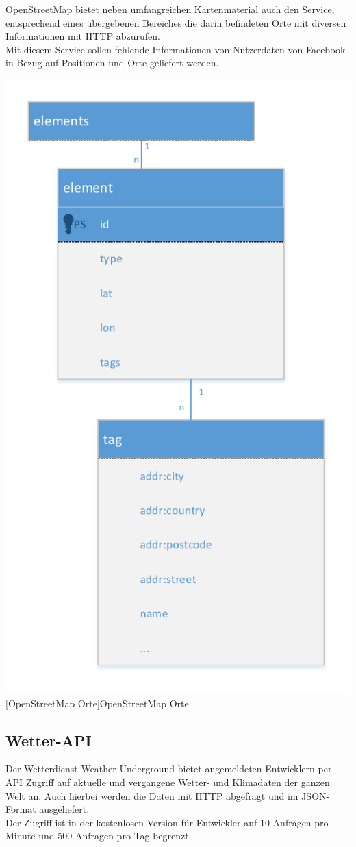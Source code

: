 \documentclass[a4paper,12pt]{scrartcl}
\begin{document}
OpenStreetMap bietet neben umfangreichen Kartenmaterial auch den Service, entsprechend eines übergebenen Bereiches die darin befindeten Orte mit diversen Informationen mit HTTP abzurufen.\\
Mit diesem Service sollen fehlende Informationen von Nutzerdaten von Facebook in Bezug auf Positionen und Orte geliefert werden.

\begin{center}
\centering
\includegraphics[width=0.5\hsize]{../OSM.pdf}%
[OpenStreetMap Orte]{OpenStreetMap Orte}%
\end{center}



\subsection{Wetter-API}

Der Wetterdienst Weather Underground bietet angemeldeten Entwicklern per API Zugriff auf aktuelle und vergangene Wetter- und Klimadaten der ganzen Welt an. Auch hierbei werden die Daten mit HTTP abgefragt und im JSON-Format ausgeliefert.\\
Der Zugriff ist in der kostenlosen Version für Entwickler auf 10 Anfragen pro Minute und 500 Anfragen pro Tag begrenzt.
\end{document}
